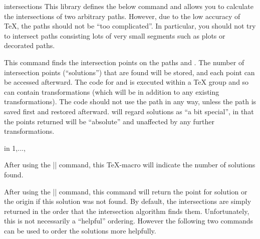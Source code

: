 \begin{pgflibrary}{intersections}
  This library defines the below command and allows you to calculate
  the intersections of  two arbitrary paths. However, due to the low accuracy of
  \TeX, the paths should not be ``too complicated''.
  In particular, you should not try to intersect paths consisting
  lots of very small segments such as plots or decorated paths.
\end{pgflibrary}

\begin{command}{\pgfintersectionofpaths{}}
  This command finds the intersection points on the paths
   and . The number of intersection points
  (``solutions'') that are found will be stored, and each point
  can be accessed afterward. The code for  and
   is executed within a \TeX{} group and so can contain
  transformations (which will be in addition to any existing
  transformations). The code should not use the path in any way,
  unless the path is saved first and restored afterward.
  \pgfname{} will regard solutions as ``a bit
  special'', in that the points returned  will be ``absolute'' and
  unaffected by any further transformations.

\begin{codeexample}[]
\begin{pgfpicture}
\pgfintersectionofpaths
{
  \pgfgetpath\temppath
  \pgfsetpath\temppath
}
{
  \pgfgetpath\temppath
  \pgfsetpath\temppath
}
\foreach \s in {1,...,\pgfintersectionsolutions}
  {\pgfpathcircle{\pgfpointintersectionsolution{\s}}{2pt}}
\end{pgfpicture}
\end{codeexample}

  \begin{command}{\pgfintersectionsolutions}
    After using the |\pgfintersectionofpaths| command, this \TeX-macro
    will indicate the number of solutions found.
  \end{command}

  \begin{command}{\pgfpointintersectionsolution{}}
    After using the |\pgfintersectionofpaths| command, this command
    will return the point for solution  or the origin
    if this solution was not found.
    By default, the intersections are simply returned in the order that
		the intersection algorithm finds them. Unfortunately, this is not
		necessarily a ``helpful'' ordering. However the following two
		commands can be used to order the solutions more helpfully.
  \end{command}


\end{command}
